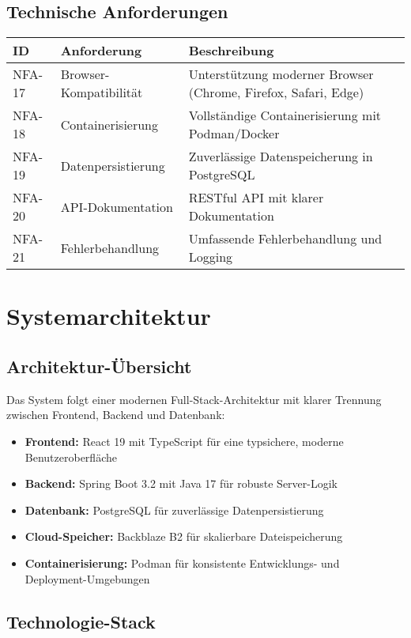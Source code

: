 \documentclass[a4paper,12pt]{article}
\begin{document}
\subsection{Technische Anforderungen}
\begin{longtable}{|p{}|p{}|p{}|}
\hline
\textbf{ID} & \textbf{Anforderung} & \textbf{Beschreibung} \\
\hline
NFA-17 & Browser-Kompatibilität & Unterstützung moderner Browser (Chrome, Firefox, Safari, Edge) \\
\hline
NFA-18 & Containerisierung & Vollständige Containerisierung mit Podman/Docker \\
\hline
NFA-19 & Datenpersistierung & Zuverlässige Datenspeicherung in PostgreSQL \\
\hline
NFA-20 & API-Dokumentation & RESTful API mit klarer Dokumentation \\
\hline
NFA-21 & Fehlerbehandlung & Umfassende Fehlerbehandlung und Logging \\
\hline
\end{longtable}

\section{Systemarchitektur}

\subsection{Architektur-Übersicht}
Das System folgt einer modernen Full-Stack-Architektur mit klarer Trennung zwischen Frontend, Backend und Datenbank:

\begin{itemize}
    \item \textbf{Frontend:} React 19 mit TypeScript für eine typsichere, moderne Benutzeroberfläche
    \item \textbf{Backend:} Spring Boot 3.2 mit Java 17 für robuste Server-Logik
    \item \textbf{Datenbank:} PostgreSQL für zuverlässige Datenpersistierung
    \item \textbf{Cloud-Speicher:} Backblaze B2 für skalierbare Dateispeicherung
    \item \textbf{Containerisierung:} Podman für konsistente Entwicklungs- und Deployment-Umgebungen
\end{itemize}

\subsection{Technologie-Stack}
\end{document}
